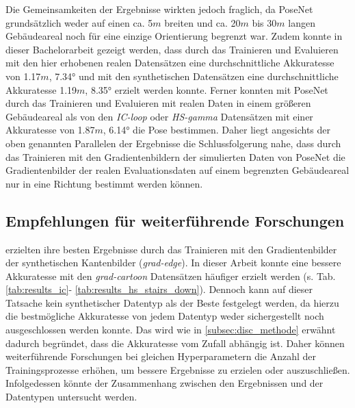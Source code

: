 Die Gemeinsamkeiten der Ergebnisse wirkten jedoch fraglich, da PoseNet grundsätzlich weder auf einen ca. 5$m$ breiten und ca. 20$m$ bis 30$m$ langen Gebäudeareal noch für eine einzige Orientierung begrenzt war. Zudem konnte in dieser Bachelorarbeit gezeigt werden, dass durch das Trainieren und Evaluieren mit den hier erhobenen realen Datensätzen eine durchschnittliche Akkuratesse von 1.17$m$, 7.34° und mit den synthetischen Datensätzen eine durchschnittliche Akkuratesse 1.19$m$, 8.35° erzielt werden konnte. Ferner konnten \citet{walchImageBasedLocalizationUsing2017} mit PoseNet durch das Trainieren und Evaluieren mit realen Daten in einem größeren Gebäudeareal als von den \textit{IC-loop} oder \textit{HS-gamma} Datensätzen mit einer Akkuratesse von 1.87$m$, 6.14° die Pose bestimmen. Daher liegt angesichts der oben genannten Parallelen der Ergebnisse die Schlussfolgerung nahe, dass durch das Trainieren mit den Gradientenbildern der simulierten Daten von PoseNet die Gradientenbilder der realen Evaluationsdaten auf einem begrenzten Gebäudeareal nur in eine Richtung bestimmt werden können.


\subsection{Empfehlungen für weiterführende Forschungen}

\citet{acharyaBIMPoseNetIndoorCamera2019} erzielten ihre besten Ergebnisse durch das Trainieren mit den Gradientenbilder der synthetischen Kantenbilder (\textit{grad-edge}). In dieser Arbeit konnte eine bessere Akkuratesse mit den \textit{grad-cartoon} Datensätzen häufiger erzielt werden (s. Tab. \ref{tab:results_ic}- \ref{tab:results_hs_stairs_down}). Dennoch kann auf dieser Tatsache kein synthetischer Datentyp als der Beste festgelegt werden, da hierzu die bestmögliche Akkuratesse von jedem Datentyp weder sichergestellt noch ausgeschlossen werden konnte. Das wird wie in \ref{subsec:disc_methode} erwähnt dadurch begründet, dass die Akkuratesse vom Zufall abhängig ist. Daher können weiterführende Forschungen bei gleichen Hyperparametern die Anzahl der Trainingsprozesse erhöhen, um bessere Ergebnisse zu erzielen oder auszuschließen. Infolgedessen könnte der Zusammenhang zwischen den Ergebnissen und der Datentypen untersucht werden. 


